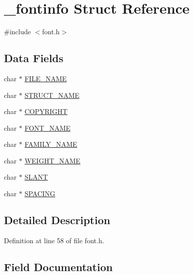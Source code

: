 \hypertarget{struct__fontinfo}{}\section{\+\_\+fontinfo Struct Reference}
\label{struct__fontinfo}


{\ttfamily \#include $<$font.\+h$>$}

\subsection*{Data Fields}
\begin{DoxyCompactItemize}
\item 
char $\ast$ \hyperlink{struct__fontinfo_a86ca02a864b7dccb21004f51bea22ed3}{F\+I\+L\+E\+\_\+\+N\+A\+ME}
\item 
char $\ast$ \hyperlink{struct__fontinfo_a861ecb4b5f190ccd1e71b38270240f86}{S\+T\+R\+U\+C\+T\+\_\+\+N\+A\+ME}
\item 
char $\ast$ \hyperlink{struct__fontinfo_a7f4b0949fe49cf3fac04f225e1f36ed2}{C\+O\+P\+Y\+R\+I\+G\+HT}
\item 
char $\ast$ \hyperlink{struct__fontinfo_a6c0f76f2668446a1c37ecab8d4e286a5}{F\+O\+N\+T\+\_\+\+N\+A\+ME}
\item 
char $\ast$ \hyperlink{struct__fontinfo_a4af43750caadb3ae9d7375f0afdcd171}{F\+A\+M\+I\+L\+Y\+\_\+\+N\+A\+ME}
\item 
char $\ast$ \hyperlink{struct__fontinfo_a2f528cb5c1bceb6afd91ad138472d071}{W\+E\+I\+G\+H\+T\+\_\+\+N\+A\+ME}
\item 
char $\ast$ \hyperlink{struct__fontinfo_aff56d18df3b46ec10896d15ad3a2e164}{S\+L\+A\+NT}
\item 
char $\ast$ \hyperlink{struct__fontinfo_a0e6fafc8f03c70ce9c506d7a506fbba4}{S\+P\+A\+C\+I\+NG}
\end{DoxyCompactItemize}


\subsection{Detailed Description}


Definition at line 58 of file font.\+h.



\subsection{Field Documentation}
